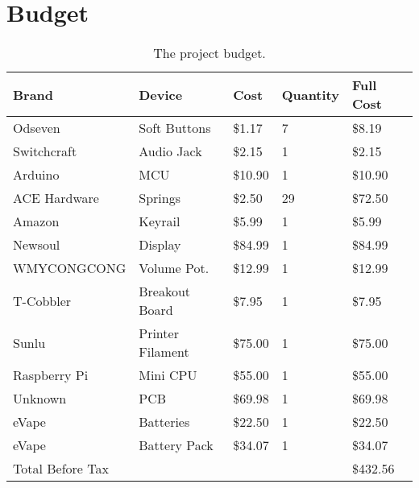 \section{Budget}
\begin{table}[h!]
  \centering
  \begin{tabular}{|l|l|l|l|l|}
    \hline
    Brand            & Device                 & Cost    & Quantity & Full Cost \\ \hline
    Odseven          & Soft Buttons           & \$1.17  & 7        & \$8.19    \\ \hline
    Switchcraft      & Audio Jack             & \$2.15  & 1        & \$2.15    \\ \hline
    Arduino          & MCU                    & \$10.90 & 1        & \$10.90   \\ \hline
    ACE Hardware     & Springs                & \$2.50  & 29       & \$72.50  \\ \hline
    Amazon           & Keyrail                & \$5.99  & 1        & \$5.99    \\ \hline
    Newsoul          & Display                & \$84.99 & 1        & \$84.99   \\ \hline
    WMYCONGCONG      & Volume Pot.            & \$12.99 & 1        & \$12.99   \\ \hline
    T-Cobbler        & Breakout Board         & \$7.95  & 1        & \$7.95    \\ \hline
    Sunlu            & Printer Filament       & \$75.00 & 1        & \$75.00   \\ \hline
    Raspberry Pi     & Mini CPU               & \$55.00 & 1        & \$55.00   \\ \hline
    Unknown          & PCB                    & \$69.98 & 1        & \$69.98   \\ \hline
    eVape            & Batteries              & \$22.50 & 1        & \$22.50   \\ \hline
    eVape            & Battery Pack           & \$34.07 & 1        & \$34.07   \\ \hline
    Total Before Tax &                        &         &          & \$432.56  \\ \hline
  \end{tabular}
  \caption{The project budget.}
  \label{Tab:budget}
\end{table}
